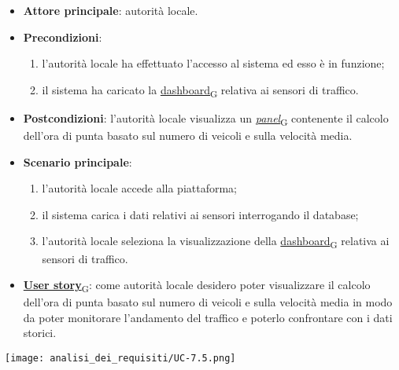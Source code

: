 \begin{itemize}
	\item \textbf{Attore principale}: autorità locale.
	\item \textbf{Precondizioni}:
	      \begin{enumerate}
		      \item l'autorità locale ha effettuato l'accesso al sistema ed esso è in funzione;
		      \item il sistema ha caricato la \href{https://7last.github.io/docs/rtb/documentazione-interna/glossario\#dashboard}{dashboard\textsubscript{G}} relativa ai sensori di traffico.
	      \end{enumerate}
	\item \textbf{Postcondizioni}: l'autorità locale visualizza un \href{https://7last.github.io/docs/rtb/documentazione-interna/glossario\#panel}{\textit{panel}\textsubscript{G}} contenente il calcolo dell'ora di punta basato sul numero di veicoli e sulla velocità media.
	\item \textbf{Scenario principale}:
	      \begin{enumerate}
		      \item l'autorità locale accede alla piattaforma;
		      \item il sistema carica i dati relativi ai sensori interrogando il database;
		      \item l'autorità locale seleziona la visualizzazione della \href{https://7last.github.io/docs/rtb/documentazione-interna/glossario\#dashboard}{dashboard\textsubscript{G}} relativa ai sensori di traffico.
	      \end{enumerate}
	\item \href{https://7last.github.io/docs/rtb/documentazione-interna/glossario\#user-story}{\textbf{User story}\textsubscript{G}}:
	      come autorità locale desidero poter visualizzare il calcolo dell'ora di punta basato sul numero di veicoli e sulla velocità media in modo da poter monitorare
	      l'andamento del traffico e poterlo confrontare con i dati storici.
\end{itemize}
\begin{center}
	\texttt{[image: analisi\_dei\_requisiti/UC-7.5.png]}
\end{center}


